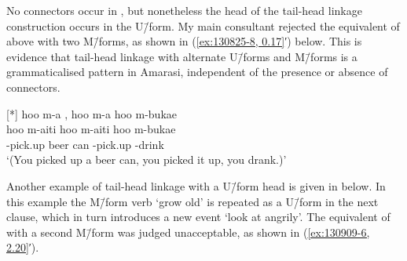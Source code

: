 \begin{exe}
	\label{ex:130825-8, 0.17}
	\begin{xlist}
		\label{ex:130825-8, 0.17 a}
		\label{ex:130825-8, 0.17 b}
	\end{xlist}
\end{exe}

No connectors occur in ,
but nonetheless the head of the tail-head linkage construction occurs in the U\=/form.
My main consultant rejected the equivalent of 
above with two M\=/forms, as shown in (\ref{ex:130825-8, 0.17}′) below.
This is evidence that tail-head linkage with alternate U\=/forms and M\=/forms
is a grammaticalised pattern in Amarasi,
independent of the presence or absence of connectors.

\begin{exe}
	{\glll	
						hoo m-a  , hoo m-a hoo m-bukae\\
						hoo m-aiti   hoo m-aiti hoo m-bukae\\
						{\hoo} \m-pick.up{\tbrM} beer can {\hoo} \m-pick.up{\tbrM} {\hoo} \m-drink\\
			\glt	`(You picked up a beer can, you picked it up, you drank.)'
						}
\end{exe}

Another example of tail-head linkage with a U\=/form head is given in  below.
In this example the M\=/form verb  `grow old'
is repeated as a U\=/form  in the next clause,
which in turn introduces a new event  `look at angrily'.
The equivalent of  with
a second M\=/form was judged unacceptable, as shown in (\ref{ex:130909-6, 2.20}′).

